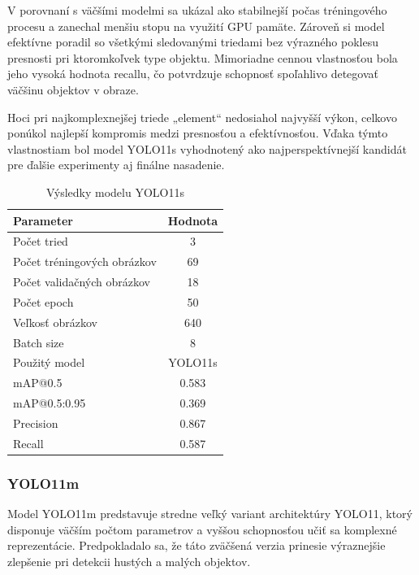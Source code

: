             V porovnaní s väčšími modelmi sa ukázal ako stabilnejší počas tréningového procesu a zanechal menšiu stopu na využití GPU pamäte. Zároveň si model efektívne poradil so všetkými sledovanými triedami bez výrazného poklesu presnosti pri ktoromkoľvek type objektu. Mimoriadne cennou vlastnosťou bola jeho vysoká hodnota recallu, čo potvrdzuje schopnosť spoľahlivo detegovať väčšinu objektov v obraze.

            Hoci pri najkomplexnejšej triede „element“ nedosiahol najvyšší výkon, celkovo ponúkol najlepší kompromis medzi presnosťou a efektívnosťou. Vďaka týmto vlastnostiam bol model YOLO11s vyhodnotený ako najperspektívnejší kandidát pre ďalšie experimenty aj finálne nasadenie.
            \begin{table}[H]
                \centering
                \begin{tabular}{|l|c|}
                \hline
                \textbf{Parameter} & \textbf{Hodnota} \\ \hline
                Počet tried & 3 \\ \hline
                Počet tréningových obrázkov & 69 \\ \hline
                Počet validačných obrázkov & 18 \\ \hline
                Počet epoch & 50 \\ \hline
                Veľkosť obrázkov & 640 \\ \hline
                Batch size & 8 \\ \hline
                Použitý model & YOLO11s \\ \hline
                mAP@0.5 & 0.583 \\ \hline
                mAP@0.5:0.95 & 0.369 \\ \hline
                Precision & 0.867 \\ \hline
                Recall & 0.587 \\ \hline
                \end{tabular}
                \caption{Výsledky modelu YOLO11s}
                \label{tab:yolo11s}
            \end{table}

            \subsubsection{YOLO11m}
            Model YOLO11m predstavuje stredne veľký variant architektúry YOLO11, ktorý disponuje väčším počtom parametrov a vyššou schopnosťou učiť sa komplexné reprezentácie. Predpokladalo sa, že táto zväčšená verzia prinesie výraznejšie zlepšenie pri detekcii hustých a malých objektov. 

